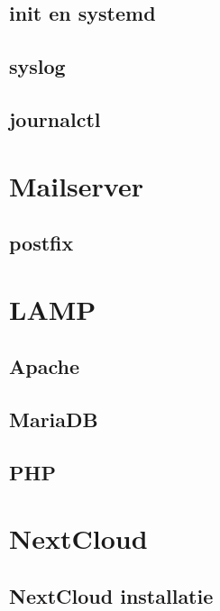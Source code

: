 \documentclass[a4paper,12pt,twoside,openright,titlepage]{book}
\begin{document}
\section{init en systemd}
\section{syslog}
\section{journalctl}

\chapter{Mailserver}
\section{postfix}

\chapter{LAMP}

\section{Apache}


\section{MariaDB}

\section{PHP}


\chapter{NextCloud}

\section{NextCloud installatie}



\backmatter
\printindex
\end{document}
